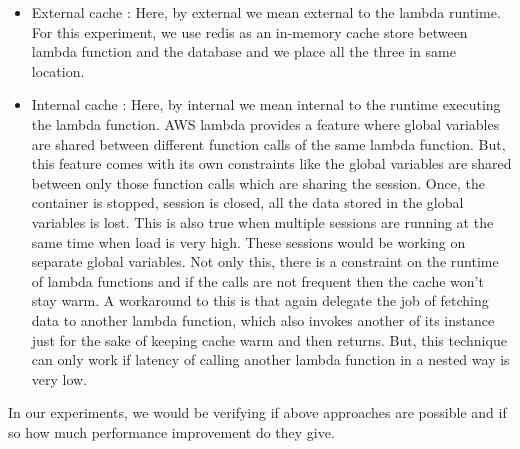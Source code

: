 \begin{itemize}
    \item External cache : Here, by external we mean external to the lambda runtime. For this experiment, we use redis as an in-memory cache store between lambda function and the database and we place all the three in same location.
    \item Internal cache : Here, by internal we mean internal to the runtime executing the lambda function. AWS lambda provides a feature where global variables are shared between different function calls of the same lambda function. But, this feature comes with its own constraints like the global variables are shared between only those function calls which are sharing the session. Once, the container is stopped, session is closed, all the data stored in the global variables is lost. This is also true when multiple sessions are running at the same time when load is very high. These sessions would be working on separate global variables. Not only this, there is a constraint on the runtime of lambda functions and if the calls are not frequent then the cache won't stay warm. A workaround to this is that again delegate the job of fetching data to another lambda function, which also invokes another of its instance just for the sake of keeping cache warm and then returns. But, this technique can only work if latency of calling another lambda function in a nested way is very low.
\end{itemize}

In our experiments, we would be verifying if above approaches are possible and if so how much performance improvement do they give.